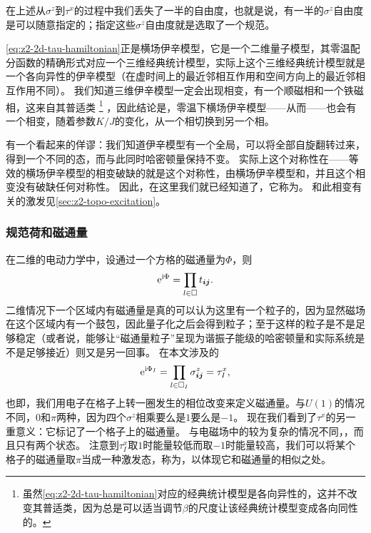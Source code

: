 在上述从$\sigma^z$到$\tau^x$的过程中我们丢失了一半的自由度，也就是说，有一半的$\sigma^z$自由度是可以随意指定的；指定这些$\sigma^z$自由度就是选取了一个规范。

\eqref{eq:z2-2d-tau-hamiltonian}正是横场伊辛模型，它是一个二维量子模型，其零温配分函数的精确形式对应一个三维经典统计模型，实际上这个三维经典统计模型就是一个各向异性的伊辛模型（在虚时间上的最近邻相互作用和空间方向上的最近邻相互作用不同）。
我们知道三维伊辛模型一定会出现相变，有一个顺磁相和一个铁磁相，这来自其普适类%
\footnote{
    虽然\eqref{eq:z2-2d-tau-hamiltonian}对应的经典统计模型是各向异性的，这并不改变其普适类，因为总是可以适当调节$\beta$的尺度让该经典统计模型变成各向同性的。
}%
，因此结论是，零温下横场伊辛模型——从而——也会有一个相变，随着参数$K / J$的变化，从一个相切换到另一个相。

有一个看起来的佯谬：我们知道伊辛模型有一个全局，可以将全部自旋翻转过来，得到一个不同的态，而与此同时哈密顿量保持不变。
实际上这个对称性在——等效的横场伊辛模型的相变破缺的就是这个对称性，由横场伊辛模型和，并且这个相变没有破缺任何对称性。
因此，在这里我们就已经知道了，它称为。
和此相变有关的激发见\autoref{sec:z2-topo-excitation}。

\subsubsection{规范荷和磁通量}

在二维的电动力学中，设通过一个方格的磁通量为$\Phi$，则
\[
    \mathrm{e}^{\mathrm{i} \Phi} = \prod_{l \in \Box} t_{\vb*{i} \vb*{j}}.
\]
二维情况下一个区域内有磁通量是真的可以认为这里有一个粒子的，因为显然磁场在这个区域内有一个鼓包，因此量子化之后会得到粒子；至于这样的粒子是不是足够稳定（或者说，能够让“磁通量粒子”呈现为谐振子能级的哈密顿量和实际系统是不是足够接近）则又是另一回事。
在本文涉及的
\begin{equation}
    \mathrm{e}^{\mathrm{i} \Phi_I} = \prod_{l \in \Box_I} {\sigma}^z_{\vb*{i} \vb*{j}} = {\tau}^x_I,
\end{equation}
也即，我们用电子在格子上转一圈发生的相位改变来定义磁通量。与$U(1)$的情况不同，$0$和$\pi$两种，因为四个$\sigma^z$相乘要么是$1$要么是$-1$。
现在我们看到了${\tau}^x$的另一重意义：它标记了一个格子上的磁通量。
与电磁场中的较为复杂的情况不同，，而且只有两个状态。
注意到$\tau_I^x$取$1$时能量较低而取$-1$时能量较高，我们可以将某个格子的磁通量取$\pi$当成一种激发态，称为，以体现它和磁通量的相似之处。

